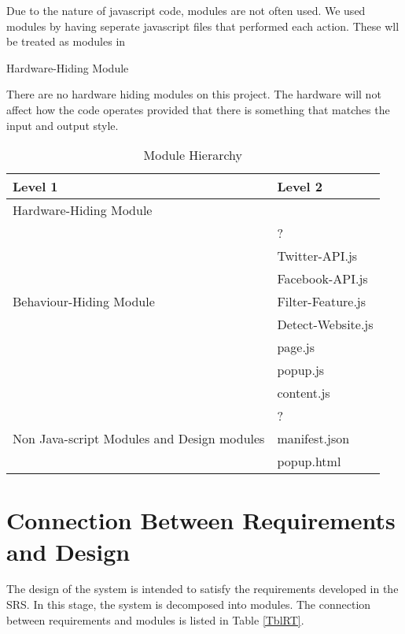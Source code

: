 \documentclass[12pt, titlepage]{article}
\newcounter{mnum}
\newcommand{\mthemnum}{M\themnum}
\begin{document}
Due to the nature of javascript code, modules are not often used. We used modules by having seperate javascript files that performed each action. These wll be treated as modules in 
\begin{description}
\item [ \mthemnum \label{mHH}:] Hardware-Hiding Module
\item There are no hardware hiding modules on this project. The hardware will not affect how the code operates provided that there is something that matches the input and output style. 
\end{description}
\begin{table}[h!]
\centering
\begin{tabular}{p{} p{}}
\toprule
\textbf{Level 1} & \textbf{Level 2}\\
\midrule
{Hardware-Hiding Module} & ~ \\
\midrule
\multirow{7}{0.3\textwidth}{Behaviour-Hiding Module} & ?\\
& Twitter-API.js\\
& Facebook-API.js\\
&Filter-Feature.js\\
&Detect-Website.js\\
& page.js\\
& popup.js\\
& content.js\\
\midrule
\multirow{3}{0.3\textwidth}{Non Java-script Modules and Design modules} & {?}\\
& manifest.json\\
& popup.html \\
\bottomrule
\end{tabular}
\caption{Module Hierarchy}
\label{TblMH}
\end{table}
\section{Connection Between Requirements and Design} \label{SecConnection}
The design of the system is intended to satisfy the requirements developed in
the SRS. In this stage, the system is decomposed into modules. The connection
between requirements and modules is listed in Table \ref{TblRT}.
\end{document}
